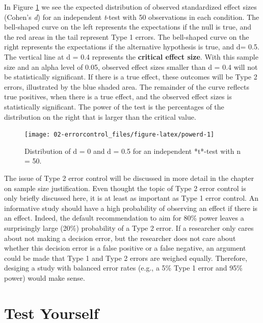 \documentclass[
  oneside]{book}
\begin{document}
In Figure \ref{fig:powerd} we see the expected distribution of observed standardized effect sizes (Cohen's \emph{d}) for an independent \emph{t}-test with 50 observations in each condition. The bell-shaped curve on the left represents the expectations if the null is true, and the red areas in the tail represent Type 1 errors. The bell-shaped curve on the right represents the expectations if the alternative hypothesis is true, and d= 0.5. The vertical line at d = 0.4 represents the \textbf{critical effect size}. With this sample size and an alpha level of 0.05, observed effect sizes smaller than d = 0.4 will not be statistically significant. If there is a true effect, these outcomes will be Type 2 errors, illustrated by the blue shaded area. The remainder of the curve reflects true positives, when there is a true effect, and the observed effect sizes is statistically significant. The power of the test is the percentages of the distribution on the right that is larger than the critical value.

\begin{figure}

{\centering \texttt{[image: 02-errorcontrol\_files/figure-latex/powerd-1]} 

}

\caption{Distribution of d = 0 and d = 0.5 for an independent *t*-test with n = 50.}\label{fig:powerd}
\end{figure}

The issue of Type 2 error control will be discussed in more detail in the chapter on sample size justification. Even thought the topic of Type 2 error control is only briefly discussed here, it is at least as important as Type 1 error control. An informative study should have a high probability of observing an effect if there is an effect. Indeed, the default recommendation to aim for 80\% power leaves a surprisingly large (20\%) probability of a Type 2 error. If a researcher only cares about not making a decision error, but the researcher does not care about whether this decision error is a false positive or a false negative, an argument could be made that Type 1 and Type 2 errors are weighed equally. Therefore, desiging a study with balanced error rates (e.g., a 5\% Type 1 error and 95\% power) would make sense.

\hypertarget{test-yourself-1}{%
\section{Test Yourself}\label{test-yourself-1}}
\end{document}
